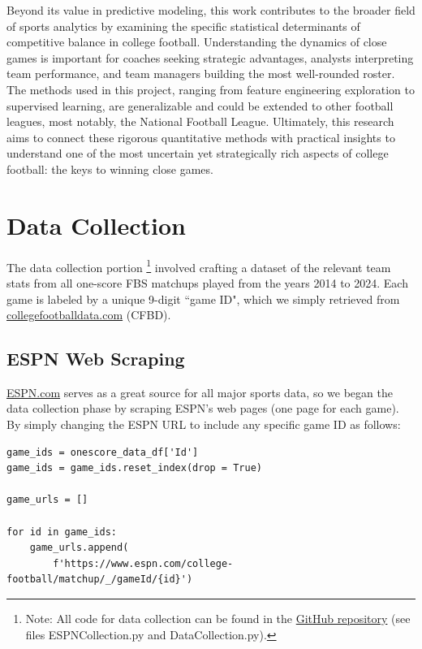 \documentclass[11pt]{amsart}
\theoremstyle{definition}                  %
\theoremstyle{remark}                       %
\numberwithin{equation}{section}
\begin{document}
Beyond its value in predictive modeling, this work contributes to the broader field of sports analytics \cite{rein2016bigdata} by examining the specific statistical determinants of competitive balance in college football. Understanding the dynamics of close games is important for coaches seeking strategic advantages, analysts interpreting team performance, and team managers building the most well-rounded roster. The methods used in this project, ranging from feature engineering exploration to supervised learning, are generalizable and could be extended to other football leagues, most notably, the National Football League. Ultimately, this research aims to connect these rigorous quantitative methods with practical insights to understand one of the most uncertain yet strategically rich aspects of college football: the keys to winning close games.

\section{Data Collection}

The data collection portion
\footnote{Note: All code for data collection can be found in the  \href{https://github.com/HarounShah/Predicting-Results-of-One-Score-Games-in-College-Football}{GitHub repository} (see files ESPNCollection.py and DataCollection.py).} 
involved crafting a dataset of the relevant team stats from all one-score FBS matchups played from the years 2014 to 2024. Each game is labeled by a unique 9-digit ``game ID", which we simply retrieved from \href{collegefootballdata.com}{collegefootballdata.com} (CFBD).

\subsection{ESPN Web Scraping}
\href{https://www.espn.com/}{ESPN.com} serves as a great source for all major sports data, so we began the data collection phase by scraping ESPN's web pages (one page for each game). By simply changing the ESPN URL to include any specific game ID as follows:

\begin{lstlisting}
game_ids = onescore_data_df['Id']
game_ids = game_ids.reset_index(drop = True)

game_urls = []

for id in game_ids:
    game_urls.append(
        f'https://www.espn.com/college-football/matchup/_/gameId/{id}')
\end{lstlisting}
\end{document}
